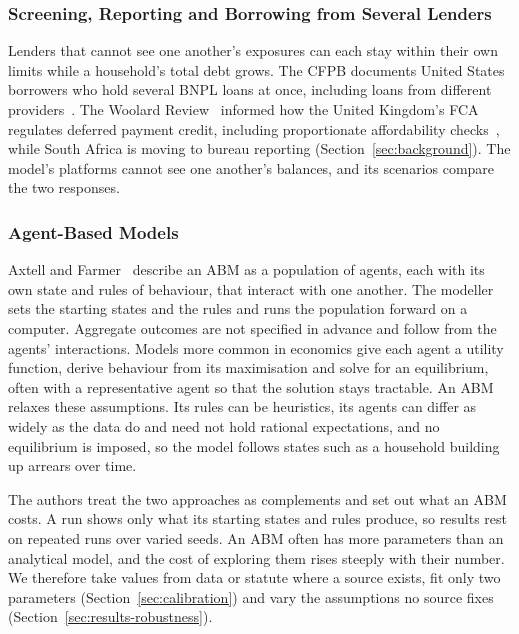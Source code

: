 \subsubsection*{Screening, Reporting and Borrowing from Several Lenders}
\label{sec:lit-regulatory}

Lenders that cannot see one another's exposures can each stay within their own limits while a
household's total debt grows. The \ac{CFPB} documents United States borrowers who hold several
\ac{BNPL} loans at once, including loans from different providers~\citep{cfpb2025bnpl}. The
Woolard Review~\citeyearpar{woolard2021} informed how the United Kingdom's \ac{FCA} regulates
deferred payment credit, including proportionate affordability checks~\citep{fca_ps26_1}, while
South Africa is moving to bureau reporting (Section~\ref{sec:background}). The model's platforms
cannot see one another's balances, and its scenarios compare the two responses.

\subsubsection*{Agent-Based Models}
\label{sec:lit-abm-method}

Axtell and Farmer~\citeyearpar{axtell2025abm} describe an \ac{ABM} as a population of agents,
each with its own state and rules of behaviour, that interact with one another. The modeller sets
the starting states and the rules and runs the population forward on a computer. Aggregate
outcomes are not specified in advance and follow from the agents' interactions. Models more
common in economics give each agent a utility function, derive behaviour from its maximisation
and solve for an equilibrium, often with a representative agent so that the solution stays
tractable. An \ac{ABM} relaxes these assumptions. Its rules can be heuristics, its agents can
differ as widely as the data do and need not hold rational expectations, and no equilibrium is
imposed, so the model follows states such as a household building up arrears over time.

The authors treat the two approaches as complements and set out what an \ac{ABM} costs. A run
shows only what its starting states and rules produce, so results rest on repeated runs over varied
seeds. An \ac{ABM} often has more parameters than an analytical model, and the cost of exploring
them rises steeply with their number. We therefore take values from data or statute where a source exists, fit
only two parameters (Section~\ref{sec:calibration}) and vary the assumptions no source fixes
(Section~\ref{sec:results-robustness}).

